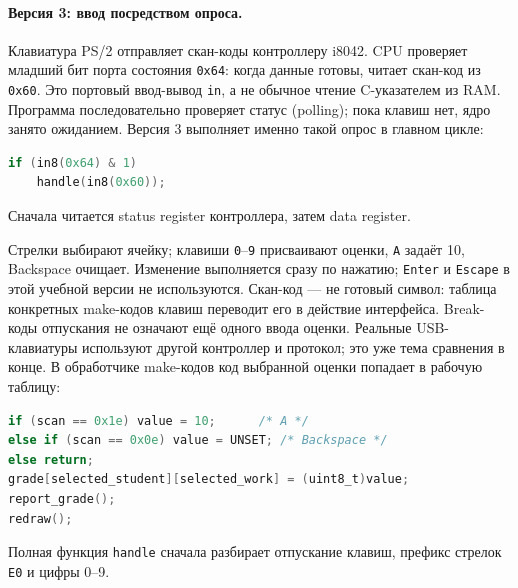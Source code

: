 \paragraph{Версия 3: ввод посредством опроса.}
Клавиатура PS/2 отправляет скан-коды контроллеру i8042. CPU проверяет
младший бит порта состояния \texttt{0x64}: когда данные готовы,
читает скан-код из \texttt{0x60}. Это портовый ввод-вывод \texttt{in},
а не обычное чтение C-указателем из RAM. Программа последовательно
проверяет статус (polling); пока клавиш нет, ядро занято ожиданием.
Версия 3 выполняет именно такой опрос в главном цикле:
\begin{lstlisting}[language=C,basicstyle=\ttfamily\small]
if (in8(0x64) & 1)
    handle(in8(0x60));
\end{lstlisting}
Сначала читается status register контроллера, затем data register.

Стрелки выбирают ячейку; клавиши \texttt{0}--\texttt{9} присваивают оценки,
\texttt{A} задаёт 10, Backspace очищает. Изменение выполняется сразу
по нажатию; \texttt{Enter} и \texttt{Escape} в этой учебной версии
не используются. Скан-код --- не готовый символ: таблица конкретных
make-кодов клавиш переводит его в действие интерфейса. Break-коды
отпускания не означают ещё одного ввода оценки. Реальные USB-клавиатуры
используют другой контроллер и протокол; это уже тема сравнения в конце.
В обработчике make-кодов код выбранной оценки попадает в рабочую таблицу:
\begin{lstlisting}[language=C,basicstyle=\ttfamily\small]
if (scan == 0x1e) value = 10;      /* A */
else if (scan == 0x0e) value = UNSET; /* Backspace */
else return;
grade[selected_student][selected_work] = (uint8_t)value;
report_grade();
redraw();
\end{lstlisting}
Полная функция \texttt{handle} сначала разбирает отпускание клавиш,
префикс стрелок \texttt{E0} и цифры 0--9.

